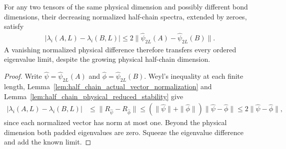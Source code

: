 \begin{lemma}
    \label{lem:half_chain_physical_eigenvalue_stability}
    \leanok
    For any two tensors of the same physical dimension and possibly
    different bond dimensions, their decreasing normalized half-chain
    spectra, extended by zeroes, satisfy
    \begin{align}
        |\lambda_i(A,L)-\lambda_i(B,L)|
        \le2\|\widehat\psi_{2L}(A)-\widehat\psi_{2L}(B)\|.
    \end{align}
    A vanishing normalized physical difference therefore transfers
    every ordered eigenvalue limit, despite the growing physical
    half-chain dimension.
\end{lemma}
\begin{proof}
    \leanok
    Write $\widehat\psi=\widehat\psi_{2L}(A)$ and
    $\widehat\phi=\widehat\psi_{2L}(B)$. Weyl's inequality at each finite
    length, Lemma~\ref{lem:half_chain_actual_vector_normalization} and
    Lemma~\ref{lem:half_chain_physical_reduced_stability} give
    \begin{align}
        |\lambda_i(A,L)-\lambda_i(B,L)|
         & \le\|R_{\widehat\psi}-R_{\widehat\phi}\|
        \le(\|\widehat\psi\|+\|\widehat\phi\|)\|\widehat\psi-\widehat\phi\|
        \le2\|\widehat\psi-\widehat\phi\|,
        \label{eq:half_chain_weyl_chain}
    \end{align}
    since each normalized vector has norm at most one.
    Beyond the physical dimension both padded eigenvalues are zero.
    Squeeze the eigenvalue difference and add the known limit.
\end{proof}

